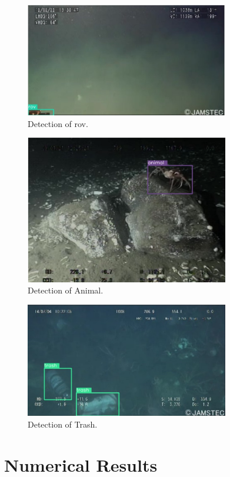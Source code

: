\documentclass[lettersize,journal]{IEEEtran}
\begin{document}
\begin{figure}[!h]
\centering
\includegraphics[width=3.5in]{r2.png}
\caption{Detection of rov.}
\label{fig_1}
\end{figure}

\begin{figure}[!h]
\centering
\includegraphics[width=3.5in]{r3.png}
\caption{Detection of Animal.}
\label{fig_1}
\end{figure}

\begin{figure}[!h]
\centering
\includegraphics[width=3.5in]{r4.png}
\caption{Detection of Trash.}
\label{fig_1}
\end{figure}






\section{Numerical Results}
\end{document}
